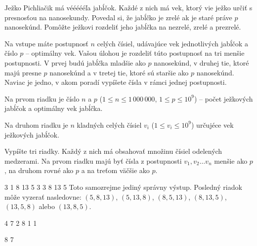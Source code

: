 




Ježko Pichliačik má véééééľa jabĺčok. Každé z nich má vek, ktorý vie ježko určiť s presnosťou na
nanosekundy. Povedal si, že jabĺčko je zrelé ak je staré práve $p$ nanosekúnd. Pomôžte ježkovi
rozdeliť jeho jabĺčka na nezrelé, zrelé a prezrelé.


Na vstupe máte postupnosť $n$ celých čísiel, udávajúce vek jednotlivých jabĺčok a číslo $p$ --
optimálny vek. Vašou úlohou je rozdeliť túto postupnosť na tri menšie postupnosti. V prvej budú
jabĺčka mladšie ako $p$ nanosekúnd, v druhej tie, ktoré majú presne $p$ nanosekúnd a v tretej tie, ktoré sú
staršie ako $p$ nanosekúnd. Naviac je jedno, v akom poradí vypíšete čísla v rámci jednej
postupnosti.


Na prvom riadku je číslo $n$ a $p$ ($1 \leq n \leq 1\,000\,000$, $1\leq p\leq 10^9$) -- počet
ježkových jabĺčok a optimálny vek jabĺčka.

Na druhom riadku je $n$ kladných celých čísiel $v_i$ ($1 \leq v_i \leq 10^9$) určujéce vek ježkových
jabĺčok.


Vypíšte tri riadky. Každý z nich má obsahovať množinu čísiel odelených medzerami. Na prvom riadku
majú byť čísla z postupnosti $v_1, v_2 \dots v_n$ menšie ako $p$, na druhom rovné ako $p$ a na
treťom väčšie ako $p$.


 3
1 8 13 5 3
3
8 13 5
\komentar
Toto samozrejme jediný správny výstup. Posledný riadok môže vyzerať nasledovne: $(5, 8, 13)$, $(5,
13, 8)$, $(8, 5, 13)$, $(8, 13, 5)$, $(13, 5, 8)$ alebo $(13, 8, 5)$. 
\koniec

 4
7 2 8 1
 1

8 7
\koniec


